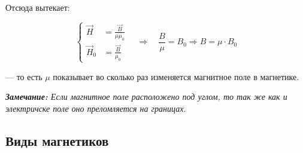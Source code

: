 \documentclass[../main.tex]{subfiles}
\begin{document}
Отсюда вытекает:

\[
    \left\{
    \begin{aligned}
        \vec H   & = \frac{\vec B}{\mu \mu_0} \\
        \vec H_0 & = \frac{\vec B}{\mu_0}
    \end{aligned}
    \right.
    \quad \Rightarrow \quad
    \frac{B}{\mu} = B_0 \Rightarrow B = \mu \cdot B_0
\]
\begin{center}
    --- то есть $ \mu$ показывает во сколько раз изменяется магнитное поле в магнетике.
\end{center}

\textit{\textbf{Замечание:} Если магнитное поле расположено под углом, то так же как и электричске поле оно преломляется на границах.}
\subsection{Виды магнетиков}
\end{document}
